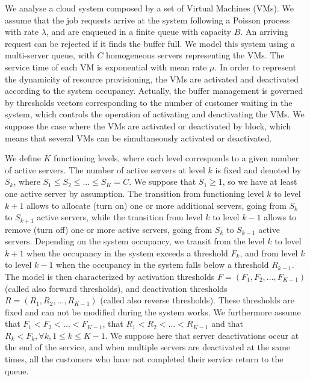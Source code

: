 \documentclass[conference]{IEEEtran}
\begin{document}
We analyse  a cloud system composed by a set of Virtual Machines (VMs). We assume that the job requests arrive at the system
following a Poisson process with rate $\lambda$, and are enqueued in a finite queue with capacity $B$. An arriving request can be rejected if
it finds the buffer full.
We model this system  using a multi-server queue,  with $C$ homogeneous servers representing the VMs. The service time of each VM  is exponential
with mean rate $\mu$. In order to represent the dynamicity of resource provisioning, the VMs are activated and deactivated according to the system
occupancy. Actually, the buffer management is governed by thresholds vectors corresponding to the number of customer waiting in the system, which
controls the operation of activating and deactivating the VMs. We suppose the case where the VMs are activated or deactivated by block, which means
that several VMs can be simultaneously activated or deactivated.

We define   $K$ functioning levels, where each level corresponds to a given number of active servers. The number of active servers at level $k$ is
fixed and denoted by $S_k$, where $S_{1} \leq S_{2} \leq ... \leq S_{K}=C$. We suppose that $S_1 \geq 1$, so we have  at least
one active server by assumption. The transition from functioning level $k$ to level $k+1$ allows to allocate (turn on) one or more additional servers, going from
$S_k$ to $S_{k+1}$ active servers, while the transition from level $k$ to level $k-1$ allows to remove (turn off) one or more active servers,
going from $S_k$ to $S_{k-1}$ active servers. Depending on the system occupancy, we transit from the level $k$ to level $k+1$ when the occupancy in
the system exceeds a threshold $F_{k}$, and from level $k$ to level $k-1$ when the occupancy in the system falls below a threshold  $R_{k-1}$.
The model is then characterized by activation thresholds  $F=(F_{1}, F_{2}, ..., F_{K-1})$ (called also forward thresholds), and deactivation
thresholds $R=(R_{1}, R_{2}, ..., R_{K-1})$ (called also reverse thresholds).
These thresholds are fixed and can not be modified during the system works.
We furthermore assume  that $F_{1}<F_{2}< ...<F_{K-1}$, that $R_{1}<R_{2}< ...<R_{K-1}$ and that $R_{k}<F_{k}, \forall k, 1 \leq k \leq K-1$.
We suppose here that server deactivations occur at the end of the service, and when multiple servers are deactivated at the same times,
all the customers who have not completed their service return to the queue.
\end{document}
